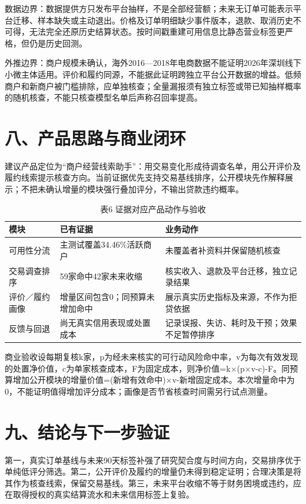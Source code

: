 \documentclass[a4paper,10pt]{article}
\newlength{\tablewidth}
\begin{document}
数据边界：数据提供方只发布平台抽样，不是全部经营额；未来无订单可能表示平台迁移、样本缺失或主动退出。价格及订单明细缺少事件版本，退款、取消历史不可得，无法完全还原历史结算状态。按时间戳重建可用信息比静态营业标签更严格，但仍是历史回测。

外推边界：商户规模未确认，海外2016—2018年电商数据不能证明2026年深圳线下小微主体适用。评价和履约同源，不能据此证明跨独立平台公开数据的增益。低频商户和新商户被门槛排除，应单独核查；全量漏报须有独立标签或带已知抽样概率的随机核查，不能只核查模型名单后声称召回率提高。


\newpage
\section*{八、产品思路与商业闭环}
建议产品定位为“商户经营线索助手”：用交易变化形成待调查名单，用公开评价及履约线索提示核查方向。当前证据优先支持交易基线排序，公开模块先作解释展示；不把未确认增量的模块强行叠加评分，不输出贷款违约概率。

\begin{table}[H]
\centering
\caption{表6 证据对应产品动作与验收}
\setlength{\tablewidth}{\linewidth}
\addtolength{\tablewidth}{-6\tabcolsep}
\begin{tabular}{>{\raggedright\arraybackslash}p{0.230\tablewidth}>{\raggedright\arraybackslash}p{0.340\tablewidth}>{\raggedright\arraybackslash}p{0.430\tablewidth}}
\toprule
\textbf{模块} & \textbf{已有证据} & \textbf{业务动作} \\
\midrule
可用性分流 & 主测试覆盖34.46\%活跃商户 & 未覆盖者补资料并保留随机核查 \\
交易调查排序 & 59家命中42家未来收缩 & 核实收入、退款及平台迁移，独立记录结果 \\
评价／履约画像 & 增量区间包含0；同预算未增加命中 & 展示真实历史指标及来源，不作为拒贷依据 \\
反馈与回退 & 尚无真实信用表现或处置成本 & 记录误报、失访、耗时及干预；效果不足暂停排序 \\
\bottomrule
\end{tabular}
\end{table}
商业验收设每期复核k家，p为经未来核实的可行动风险命中率，v为每次有效发现的处置净价值，c为单家核查成本，F为固定成本，则净价值=k×(p×v-c)-F。同预算增加公开模块的增量价值=(新增有效命中)×v-新增固定成本。本次增量命中为0，不能证明值得增加评分成本；画像是否节省核查时间需另行试点测量。

\section*{九、结论与下一步验证}
第一，真实订单基线与未来90天标签补强了研究契合度与时间方向，交易排序优于单纯低评分筛选。第二，公开评价及履约的增量仍未得到稳定证明；合理决策是将其作为核查线索，保留交易基线。第三，未来平台收缩不等于财务困境或违约，应在取得授权的真实结算流水和未来信用标签上复验。
\end{document}
